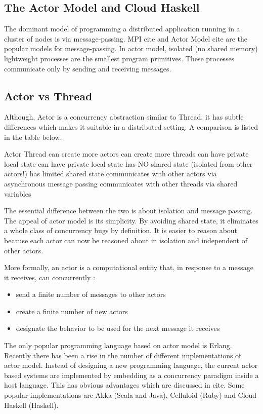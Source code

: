 \subsection{The Actor Model and Cloud Haskell}

The dominant model of programming a distributed application running in
a cluster of nodes is via message-passing. MPI cite and Actor
Model cite are the popular models for message-passing. In actor
model, isolated (no shared memory) lightweight processes are the
smallest program primitives. These processes communicate only by
sending and receiving messages.

\subsection{Actor vs Thread}

Although, Actor is a concurrency abstraction similar to Thread, it has
subtle differences which makes it suitable in a distributed setting. A
comparison is listed in the table below.

Actor	Thread
can create more actors	can create more threads
can have private local state	can have private local state
has NO shared state (isolated from other actors!)	has limited shared state
communicates with other actors via asynchronous message passing	communicates with other threads via shared variables

The essential difference between the two is about isolation and
message passing. The appeal of actor model is its simplicity. By
avoiding shared state, it eliminates a whole class of concurrency bugs
by definition. It is easier to reason about because each actor can now
be reasoned about in isolation and independent of other actors.

More formally, an actor is a computational entity that, in response to a
message it receives, can concurrently :
\begin{itemize}
\item send a finite number of messages to other actors
\item create a finite number of new actors
\item designate the behavior to be used for the next message it receives
\end{itemize}

The only popular programming language based on actor model is Erlang.
Recently there has been a rise in the number of different
implementations of actor model. Instead of designing a new programming
language, the current actor based systems are implemented by embedding
as a concurrency paradigm inside a host language. This has obvious
advantages which are discussed in {cite}. Some popular
implementations are Akka (Scala and Java), Celluloid (Ruby) and Cloud
Haskell (Haskell).

